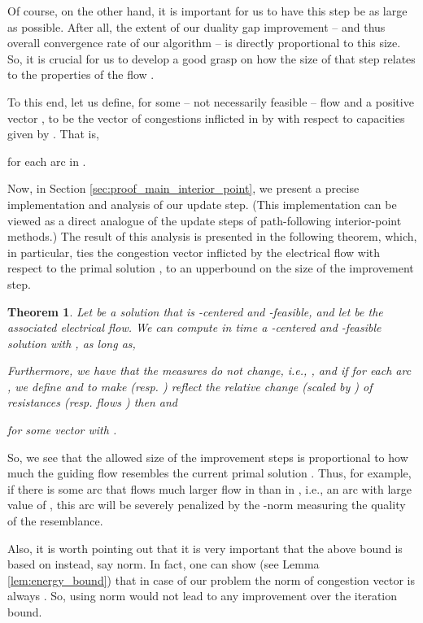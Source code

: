 \documentclass[11pt, letterpaper]{article}
\newtheorem{theorem}{Theorem}[section]
\begin{document}
Of course, on the other hand, it is important for us to have this step be as large as possible. After all, the extent of our duality gap improvement -- and thus overall convergence rate of our algorithm -- is directly proportional to this size. So, it is crucial for us to develop a good grasp on how the size of that step relates to the properties of the flow . 

To this end, let us define, for some -- not necessarily feasible -- flow  and a positive vector ,  to be the vector of congestions inflicted in  by  with respect to capacities given by .  That is, 

for each arc  in . 

Now, in Section \ref{sec:proof_main_interior_point}, we present a precise implementation and analysis of our update step. (This implementation can be viewed as a direct analogue of the update steps of path-following interior-point methods.) The result of this analysis is presented in the following theorem, which, in particular, ties the congestion vector  inflicted by the electrical flow  with respect to the primal solution , to an upperbound on the size  of the improvement step. 

\begin{theorem}
\label{thm:main_interior_point}
Let  be a solution that is -centered and -feasible, and let  be the associated electrical flow. We can compute in  time a -centered and -feasible solution  with , as long as, 

Furthermore, we have that the measures do not change, i.e., , and if for each arc , we define  and  to make  (resp. ) reflect the relative change (scaled by ) of resistances  (resp. flows ) then  and

for some vector  with .
\end{theorem} 

So, we see that the allowed size  of the improvement steps is proportional to how much the guiding flow  resembles the current primal solution . Thus, for example, if there is some arc  that flows much larger flow in  than in , i.e., an arc  with large value of , this arc will be severely penalized by the -norm measuring the quality of the resemblance. 

Also, it is worth pointing out that it is very important that the above bound is based on  instead, say  norm. In fact, one can show (see Lemma \ref{lem:energy_bound}) that in case of our problem the  norm of congestion vector is always . So, using  norm would not lead to any improvement over the  iteration bound. 
\end{document}
